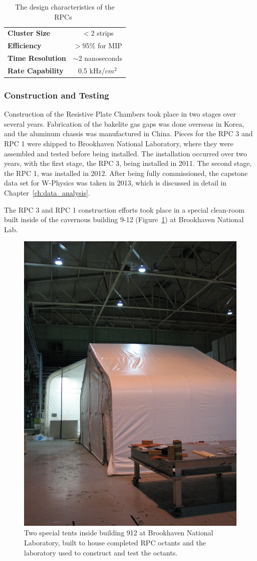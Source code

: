 \begin{table}[ht]
  \centering
  \begin{tabular}{lc}
    \toprule 
    \textbf{Cluster Size} & $<$2 strips \\
    \textbf{Efficiency} & $>$95\% for MIP \\
    \textbf{Time Resolution} & $\sim$2 nanoseconds \\
    \textbf{Rate Capability} & 0.5 kHz/$cm^2$ \\
    \bottomrule
  \end{tabular}
  \caption{
    The design characteristics of the RPCs~\cite{Fukao2011}
  }
  \label{tab:rpc_design_characteristics}
\end{table}

\subsubsection{Construction and Testing}

Construction of the Resistive Plate Chambers took place in two stages over
several years. Fabrication of the bakelite gas gaps was done overseas in Korea,
and the aluminum chassis was manufactured in China. Pieces for the RPC 3 and RPC
1 were shipped to Brookhaven National Laboratory, where they were assembled and
tested before being installed. The installation occurred over two years, with
the first stage, the RPC 3, being installed in 2011. The second stage, the RPC
1, was installed in 2012. After being fully commissioned, the capstone data set
for W-Physics was taken in 2013, which is discussed in detail in
Chapter~\ref{ch:data_analysis}.

The RPC 3 and RPC 1 construction efforts took place in a special clean-room
built inside of the cavernous building 9-12 (Figure~\ref{fig:building_912}) at
Brookhaven National Lab.

\begin{figure}
  \centering
  \includegraphics[width=0.5\linewidth]{./figures/building_912_rpc_tent.jpg}
  \caption{
    Two special tents inside building 912 at Brookhaven National Laboratory,
    built to house completed RPC octants and the laboratory used to construct
    and test the octants. 
  }
  \label{fig:building_912}
\end{figure}

